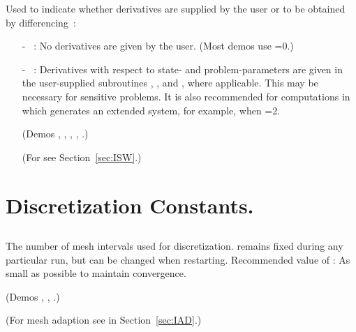  Used to indicate whether derivatives are supplied by the user
 or to be obtained by differencing~:
\begin{itemize}
\item[-] ~: 
  No derivatives are given by the user. (Most demos use =0.)
\item[-] ~:  
  Derivatives with respect to state- and problem-parameters are given 
  in the user-supplied subroutines 
  , ,  and , where 
  applicable.  This may be necessary for sensitive problems. 
  It is also recommended for computations in which \AUTO generates 
  an extended system, for example, when =2.

  (Demos , , , , .)

  (For  see Section~\ref{sec:ISW}.) 
\end{itemize}
\section{ Discretization Constants.} \label{sec:Discretization_constants}
\subsection{}  \label{sec:NTST}


 The number of mesh intervals used for discretization.
  remains fixed during any particular run, but can be changed
 when restarting. 
 Recommended value of  : As small as possible to maintain convergence. 
 
 (Demos , , .)

 (For mesh adaption see  in Section~\ref{sec:IAD}.)


\subsection{}  \label{sec:NCOL}

